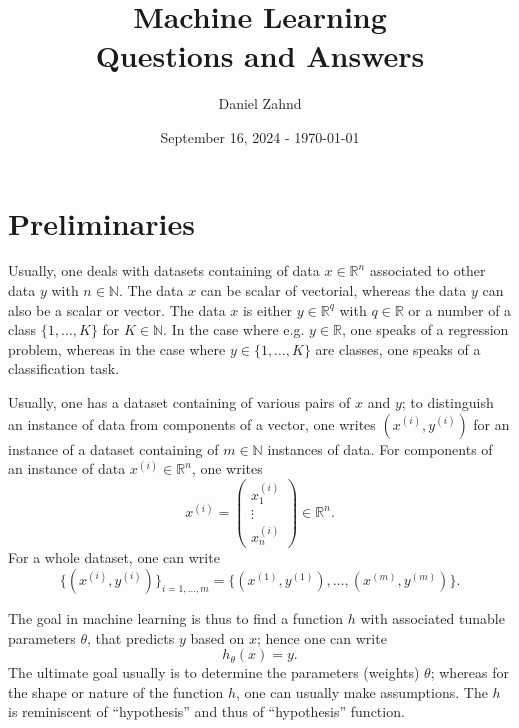 \documentclass[a4paper,11pt]{article}
\title{Machine Learning\\ \vspace{0.2cm}\normalsize Questions and Answers}
\author{Daniel Zahnd}
\date{September 16, 2024 - \today}
\newcounter{question}
\numberwithin{equation}{section}
\begin{document}
\newcommand\Que[1]{%
   \leavevmode\par
   \stepcounter{question}
   \noindent
   \thequestion. \textbf{Q} --- #1\par}

\newcommand\Ans[2][]{%
    \leavevmode\par\noindent
   {\leftskip0pt
    \textbf{A} --- \textbf{#1}#2\par}}

\maketitle
\tableofcontents

\setcounter{page}{1}

\section{Preliminaries}
Usually, one deals with datasets containing of data $x \in \mathbb{R}^n$ associated to other data $y$ with $n \in \mathbb{N}$. The data $x$ can be scalar of vectorial, whereas the data $y$ can also be a scalar or vector. The data $x$ is either $y \in \mathbb{R}^q$ with $q \in \mathbb{R}$ or a number of a class $\{1,\dots,K\}$ for $K \in \mathbb{N}$. In the case where e.g. $y \in \mathbb{R}$, one speaks of a regression problem, whereas in the case where $y \in\{1,\dots,K\}$ are classes, one speaks of a classification task.

Usually, one has a dataset containing of various pairs of $x$ and $y$; to distinguish an instance of data from components of a vector, one writes $(x^{(i)}, y^{(i)})$ for an instance of a dataset containing of $m \in \mathbb{N}$ instances of data. For components of an instance of data $x^{(i)} \in \mathbb{R}^n$, one writes \begin{equation}
	x^{(i)} = \begin{pmatrix}
		x^{(i)}_1 \\ \vdots \\ x^{(i)}_n
	\end{pmatrix} \in \mathbb{R}^n.
\end{equation} For a whole dataset, one can write \begin{equation}
\{(x^{(i)}, y^{(i)})\}_{i=1,\dots,m} = \{(x^{(1)}, y^{(1)}), \dots , (x^{(m)}, y^{(m)})\}.
\end{equation}

The goal in machine learning is thus to find a function $h$ with associated tunable parameters $\theta$, that predicts $y$ based on $x$; hence one can write \begin{equation}
	h_\theta(x) = y.
\end{equation} The ultimate goal usually is to determine the parameters (weights) $\theta$; whereas for the shape or nature of the function $h$, one can usually make assumptions. The $h$ is reminiscent of ``hypothesis'' and thus of ``hypothesis'' function.
\end{document}
